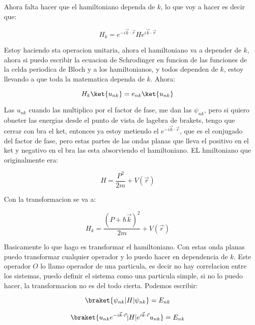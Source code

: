 \documentclass[11pt,fleqn]{book}
\begin{document}
Ahora falta hacer que el hamiltoniano dependa de $k$, lo que voy a hacer es decir que:

\begin{equation}
    H_{k}=e^{-i\vec{k}\cdot\vec{r}}He^{i\vec{k}\cdot\vec{r}}
\end{equation}

Estoy haciendo sta operacion unitaria, ahora el hamiltoniano va a depender de $k$, ahora si puedo escribir la ecuacion de Schrodinger en funcion de las funciones de la celda periodica de Bloch  y a los hamiltonianos, y todos dependen de $k$, estoy llevando a que toda la matematica dependa de $k$. Ahora:

\begin{equation}
    H_{k}\ket{u_{nk}}=e_{nk}\ket{u_{nk}}
\end{equation}

Las $u_{nk}$ cuando las multiplico por el factor de fase, me dan las $\psi_{nk}$, pero si quiero obneter las energias desde el punto de vista de lagebra de brakets, tengo que cerrar con bra el ket, entonces ya estoy metiendo el $e^{-i\vec{k}\cdot\vec{r}}$, que es el conjugado del factor de fase, pero estas partes de las ondas planas que lleva el positivo en el ket y negativo en el bra las esta absorviendo el hamiltoniano. EL hmiltoniano  que originalmente era:

\begin{equation*}
    H=\frac{P^{2}}{2m}+V(\vec{r})
\end{equation*}

Con la transformacion se va a:

\begin{equation}
    H_{k}=\frac{(P+\hbar\vec{k})^{2}}{2m}+V(\vec{r})
\end{equation}

Basicamente lo que hago es transformar el hamiltoniano. Con estas onda planas puedo transformar cualquier operador y lo puedo hacer en dependencia de $k$. Este operador $O$ lo llamo operador de una particula, es decir no hay correlacion entre los sistemas, puedo definir el sistema  como una particula simple, si no lo puedo hacer, la transformacion no es del todo cierta. Podemos escribir:

\begin{equation}
    \braket{\psi_{nk}|H|\psi_{nk}}=E_{nk}
\end{equation}

\begin{equation}
    \braket{u_{nk}e^{-i\vec{k}\cdot\vec{r}}|H|e^{i\vec{k}\cdot\vec{r}}u_{nk}}=E_{nk}
\end{equation}
\end{document}
